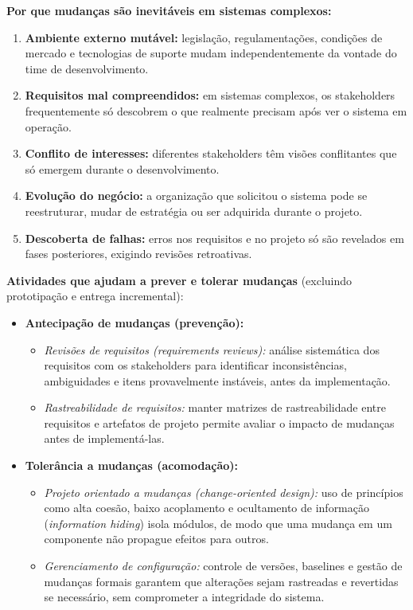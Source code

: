 \documentclass[12pt,a4paper]{article}
\begin{document}
\begin{resposta}

\textbf{Por que mudanças são inevitáveis em sistemas complexos:}

\begin{enumerate}[nosep]
  \item \textbf{Ambiente externo mutável:} legislação, regulamentações,
        condições de mercado e tecnologias de suporte mudam independentemente
        da vontade do time de desenvolvimento.
  \item \textbf{Requisitos mal compreendidos:} em sistemas complexos, os
        stakeholders frequentemente só descobrem o que realmente precisam
        após ver o sistema em operação.
  \item \textbf{Conflito de interesses:} diferentes stakeholders têm visões
        conflitantes que só emergem durante o desenvolvimento.
  \item \textbf{Evolução do negócio:} a organização que solicitou o sistema pode
        se reestruturar, mudar de estratégia ou ser adquirida durante o projeto.
  \item \textbf{Descoberta de falhas:} erros nos requisitos e no projeto só
        são revelados em fases posteriores, exigindo revisões retroativas.
\end{enumerate}

\textbf{Atividades que ajudam a prever e tolerar mudanças}
(excluindo prototipação e entrega incremental):

\begin{itemize}
  \item \textbf{Antecipação de mudanças (prevenção):}
  \begin{itemize}[nosep]
    \item \textit{Revisões de requisitos (\textit{requirements reviews}):} análise
          sistemática dos requisitos com os stakeholders para identificar
          inconsistências, ambiguidades e itens provavelmente instáveis, antes
          da implementação.
    \item \textit{Rastreabilidade de requisitos:} manter matrizes de rastreabilidade
          entre requisitos e artefatos de projeto permite avaliar o impacto de
          mudanças antes de implementá-las.
  \end{itemize}

  \item \textbf{Tolerância a mudanças (acomodação):}
  \begin{itemize}[nosep]
    \item \textit{Projeto orientado a mudanças (\textit{change-oriented design}):}
          uso de princípios como alta coesão, baixo acoplamento e ocultamento de
          informação (\textit{information hiding}) isola módulos, de modo que uma
          mudança em um componente não propague efeitos para outros.
    \item \textit{Gerenciamento de configuração:} controle de versões, baselines e
          gestão de mudanças formais garantem que alterações sejam rastreadas e
          revertidas se necessário, sem comprometer a integridade do sistema.
  \end{itemize}
\end{itemize}


\end{resposta}
\end{document}

